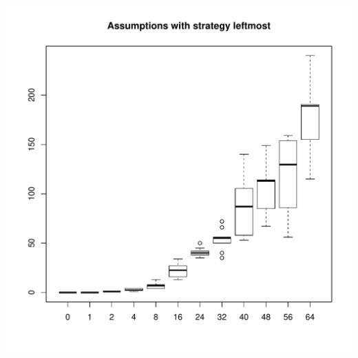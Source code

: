 \documentclass{article}
\begin{document}
\includegraphics[width=\linewidth]{leftmost_assumptions}


\printglossaries{}
\end{document}
